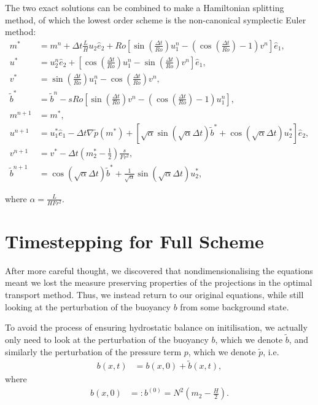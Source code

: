 \documentclass[11pt, oneside]{article}   	%
\newcommand{\eone}{\hat{e}_1}
\newcommand{\etwo}{\hat{e}_2}
\newcommand{\bt}{\tilde{b}}
\newcommand{\pt}{\tilde{p}}
\newcommand{\dt}{\Delta t}
\begin{document}
The two exact solutions can be combined to make a Hamiltonian splitting method, of which the lowest order scheme is the non-canonical symplectic Euler method:
\begin{align} 
m^{*} &= m^n + \dt \frac{L}{H} u_2 \etwo + Ro [\sin(\frac{\dt}{Ro}) u_1^n - (\cos(\frac{\dt}{Ro}) - 1) v^n] \eone, \\
u^{*} &= u_2^n \etwo + [\cos(\frac{\dt}{Ro}) u_1^n - \sin(\frac{\dt}{Ro}) v^n] \eone, \\
v^{*} &= \sin(\frac{\dt}{Ro}) u_1^n - \cos(\frac{\dt}{Ro}) v^n, \\
\bt^{*} &= \bt^n - sRo[\sin(\frac{\dt}{Ro}) v^n - (\cos(\frac{\dt}{Ro}) - 1) u_1^n], \\
m^{n+1} &= m^{*}, \\
u^{n+1} &=  u_1^{*} \eone - \dt \nabla \pt(m^{*}) + [\sqrt{\alpha} \sin(\sqrt{\alpha} \dt)  \bt^{*} + \cos(\sqrt{\alpha} \dt) u_2^{*}] \etwo, \\
v^{n+1} &= v^{*} - \dt (m_2^{*} - \frac{1}{2})\frac{s}{Fr^2}, \\
\bt^{n+1} &= \cos(\sqrt{\alpha} \dt)  \bt^{*} + \frac{1}{\sqrt{\alpha}} \sin(\sqrt{\alpha} \dt) u_2^{*},
\end{align}

where \(\alpha = \frac{L}{H Fr^2}\).



\section{Timestepping for Full Scheme}

After more careful thought, we discovered that nondimensionalising the equations meant we lost the measure preserving properties of the projections in the optimal transport method. Thus, we instead return to our original equations, while still looking at the perturbation of the buoyancy \(b\) from some background state.

To avoid the process of ensuring hydrostatic balance on initilisation, we actually only need to look at the perturbation of the buoyancy \(b\), which we denote \(\bt\), and similarly the perturbation of the pressure term \(p\), which we denote \(\pt\), i.e.
\begin{align} 
b(x, t) &= b(x, 0) + \bt(x, t),
\end{align}
where
\begin{align} 
b(x, 0) &=: b^{(0)} = N^2 (m_2 - \frac{H}{2}).
\end{align}
\end{document}

